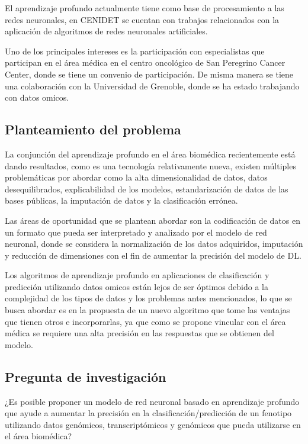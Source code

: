 El aprendizaje profundo actualmente tiene como base de procesamiento a las redes neuronales, en CENIDET se cuentan con trabajos relacionados con la aplicación de algoritmos de redes neuronales artificiales.

Uno de los principales intereses es la participación con especialistas que participan en el área médica en el centro oncológico de San Peregrino Cancer Center, donde se tiene un convenio de participación. De misma manera se tiene una colaboración con la Universidad de Grenoble, donde se ha estado trabajando con datos omicos.

\subsection{Planteamiento del problema}

La conjunción del aprendizaje profundo en el área biomédica recientemente está dando resultados, como es una tecnología relativamente nueva, existen múltiples problemáticas por abordar como la alta dimensionalidad de datos, datos desequilibrados, explicabilidad de los modelos, estandarización de datos de las bases públicas, la imputación de datos y la clasificación errónea.

Las áreas de oportunidad que se plantean abordar son la codificación de datos en un formato que pueda ser interpretado y analizado por el modelo de red neuronal, donde se considera la normalización de los datos adquiridos, imputación y reducción de dimensiones con el fin de aumentar la precisión del modelo de DL.

Los algoritmos de aprendizaje profundo en aplicaciones de clasificación y predicción utilizando datos omicos están lejos de ser óptimos debido a la complejidad de los tipos de datos y los problemas antes mencionados, lo que se busca abordar es en la propuesta de un nuevo algoritmo que tome las ventajas que tienen otros e incorporarlas, ya que como se propone vincular con el área médica se requiere una alta precisión en las respuestas que se obtienen del modelo.

\subsection{Pregunta de investigación}

¿Es posible proponer un modelo de red neuronal basado en aprendizaje profundo que ayude a aumentar la precisión en la clasificación/predicción de un fenotipo utilizando datos genómicos, transcriptómicos y genómicos que pueda utilizarse en el área biomédica?

